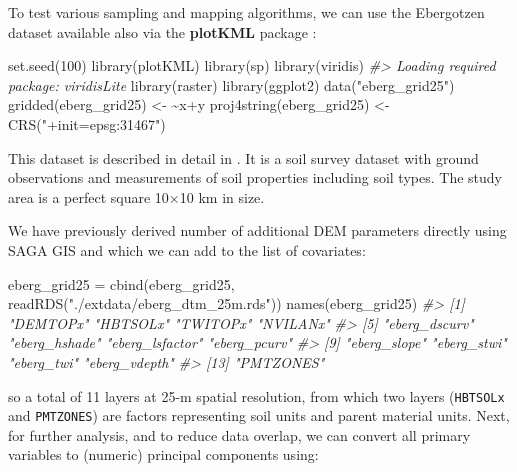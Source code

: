 \documentclass[
  graybox,natbib,nospthms]{svmono}
\newenvironment{Shaded}{\begin{snugshade}}{\end{snugshade}}
\newcommand{\CommentTok}[1]{\textcolor[rgb]{0.37,0.37,0.37}{\textit{#1}}}
\newcommand{\DecValTok}[1]{\textcolor[rgb]{0.06,0.06,0.06}{#1}}
\newcommand{\ErrorTok}[1]{\textcolor[rgb]{0.14,0.14,0.14}{\textbf{#1}}}
\newcommand{\FunctionTok}[1]{\textcolor[rgb]{0,0,0}{#1}}
\newcommand{\NormalTok}[1]{#1}
\newcommand{\OtherTok}[1]{\textcolor[rgb]{0.37,0.37,0.37}{#1}}
\newcommand{\SpecialCharTok}[1]{\textcolor[rgb]{0,0,0}{#1}}
\newcommand{\StringTok}[1]{\textcolor[rgb]{0.5,0.5,0.5}{#1}}
\begin{document}
To test various sampling and mapping algorithms, we can use the Ebergotzen
dataset available also via the \textbf{plotKML} package \citep{hengl2015plotkml}:

\begin{Shaded}
\begin{Highlighting}[]
\FunctionTok{set.seed}\NormalTok{(}\DecValTok{100}\NormalTok{)}
\FunctionTok{library}\NormalTok{(plotKML)}
\FunctionTok{library}\NormalTok{(sp)}
\FunctionTok{library}\NormalTok{(viridis)}
\CommentTok{\#\textgreater{} Loading required package: viridisLite}
\FunctionTok{library}\NormalTok{(raster)}
\FunctionTok{library}\NormalTok{(ggplot2)}
\FunctionTok{data}\NormalTok{(}\StringTok{"eberg\_grid25"}\NormalTok{)}
\FunctionTok{gridded}\NormalTok{(eberg\_grid25) }\OtherTok{\textless{}{-}} \ErrorTok{\textasciitilde{}}\NormalTok{x}\SpecialCharTok{+}\NormalTok{y}
\FunctionTok{proj4string}\NormalTok{(eberg\_grid25) }\OtherTok{\textless{}{-}} \FunctionTok{CRS}\NormalTok{(}\StringTok{"+init=epsg:31467"}\NormalTok{)}
\end{Highlighting}
\end{Shaded}

This dataset is described in detail in \citet{Bohner2008Hamburg}. It is a soil survey
dataset with ground observations and measurements of soil properties including soil
types. The study area is a perfect square 10×10 km in size.

We have previously derived number of additional DEM parameters directly using SAGA GIS
\citep{Conrad2015} and which we can add to the list of covariates:

\begin{Shaded}
\begin{Highlighting}[]
\NormalTok{eberg\_grid25 }\OtherTok{=} \FunctionTok{cbind}\NormalTok{(eberg\_grid25, }\FunctionTok{readRDS}\NormalTok{(}\StringTok{"./extdata/eberg\_dtm\_25m.rds"}\NormalTok{))}
\FunctionTok{names}\NormalTok{(eberg\_grid25)}
\CommentTok{\#\textgreater{}  [1] "DEMTOPx"        "HBTSOLx"        "TWITOPx"        "NVILANx"       }
\CommentTok{\#\textgreater{}  [5] "eberg\_dscurv"   "eberg\_hshade"   "eberg\_lsfactor" "eberg\_pcurv"   }
\CommentTok{\#\textgreater{}  [9] "eberg\_slope"    "eberg\_stwi"     "eberg\_twi"      "eberg\_vdepth"  }
\CommentTok{\#\textgreater{} [13] "PMTZONES"}
\end{Highlighting}
\end{Shaded}

so a total of 11 layers at 25-m spatial resolution, from which two layers
(\texttt{HBTSOLx} and \texttt{PMTZONES}) are factors representing soil units and parent material
units. Next, for further analysis, and to reduce data overlap, we can convert all
primary variables to (numeric) principal components using:
\end{document}
